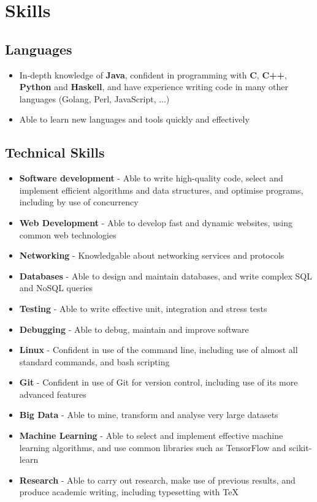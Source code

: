 \documentclass[a4paper, 8pt]{extarticle}
\begin{document}
\begin{minipage}[t]{.33\textwidth}
\section*{Skills}

\subsection*{Languages}
\begin{itemize}
\item In-depth knowledge of \textbf{Java}, confident in programming with \textbf{C}, \textbf{C++}, \textbf{Python} and \textbf{Haskell}, and have experience writing code in many other languages (Golang, Perl, JavaScript, ...)
\item Able to learn new languages and tools quickly and effectively
\end{itemize}

\subsection*{Technical Skills}
\begin{itemize}
\item \textbf{Software development} - Able to write high-quality code, select and implement efficient algorithms and data structures, and optimise programs, including by use of concurrency
\item \textbf{Web Development} - Able to develop fast and dynamic websites, using common web technologies
\item \textbf{Networking} - Knowledgable about networking services and protocols
\item \textbf{Databases} - Able to design and maintain databases, and write complex SQL and NoSQL queries
\item \textbf{Testing} - Able to write effective unit, integration and stress tests
\item \textbf{Debugging} - Able to debug, maintain and improve software
\item \textbf{Linux} - Confident in use of the command line, including use of almost all standard commands, and bash scripting
\item \textbf{Git} - Confident in use of Git for version control, including use of its more advanced features
\item \textbf{Big Data} - Able to mine, transform and analyse very large datasets
\item \textbf{Machine Learning} - Able to select and implement effective machine learning algorithms, and use common libraries such as TensorFlow and scikit-learn
\item \textbf{Research} - Able to carry out research, make use of previous results, and produce academic writing, including typesetting with \TeX
\end{itemize}



\end{minipage}
\end{document}
